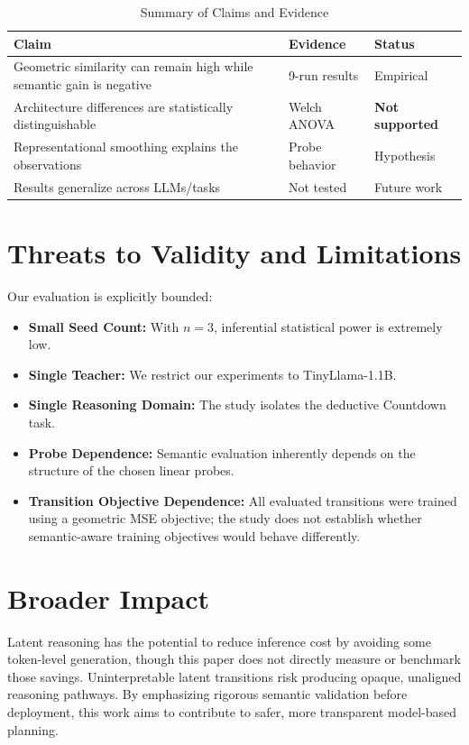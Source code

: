 \documentclass[conference]{IEEEtran}
\begin{document}
\begin{table}[h]
\centering
\caption{Summary of Claims and Evidence}
\label{tab:claims}
\begin{tabular}{p{4.2cm}ll}
\toprule
\textbf{Claim} & \textbf{Evidence} & \textbf{Status} \\
\midrule
Geometric similarity can remain high while semantic gain is negative & 9-run results & Empirical \\
\midrule
Architecture differences are statistically distinguishable & Welch ANOVA & \textbf{Not supported} \\
\midrule
Representational smoothing explains the observations & Probe behavior & Hypothesis \\
\midrule
Results generalize across LLMs/tasks & Not tested & Future work \\
\bottomrule
\end{tabular}
\end{table}

\section{Threats to Validity and Limitations}
Our evaluation is explicitly bounded:
\begin{itemize}
    \item \textbf{Small Seed Count:} With $n=3$, inferential statistical power is extremely low.
    \item \textbf{Single Teacher:} We restrict our experiments to TinyLlama-1.1B. 
    \item \textbf{Single Reasoning Domain:} The study isolates the deductive Countdown task.
    \item \textbf{Probe Dependence:} Semantic evaluation inherently depends on the structure of the chosen linear probes.
    \item \textbf{Transition Objective Dependence:} All evaluated transitions were trained using a geometric MSE objective; the study does not establish whether semantic-aware training objectives would behave differently.
\end{itemize}

\section{Broader Impact}
Latent reasoning has the potential to reduce inference cost by avoiding some token-level generation, though this paper does not directly measure or benchmark those savings. Uninterpretable latent transitions risk producing opaque, unaligned reasoning pathways. By emphasizing rigorous semantic validation before deployment, this work aims to contribute to safer, more transparent model-based planning.
\end{document}
